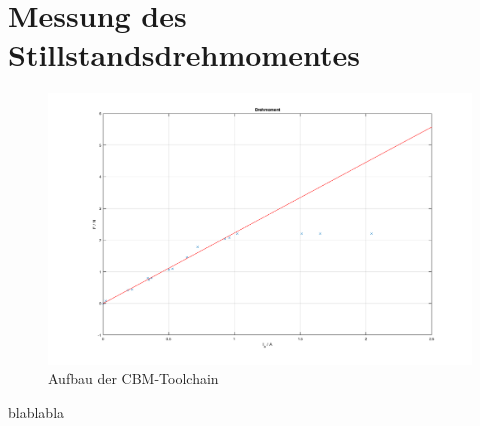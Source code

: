 \section{Messung des Stillstandsdrehmomentes}

\begin{figure}[htp]
 \centering
 \includegraphics[width=1\textwidth]{a_1-1.png}
 \caption{Aufbau der CBM-Toolchain}
 \label{fig:Schnittstellen_IGX-560}
\end{figure}




blablabla